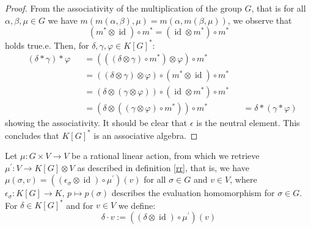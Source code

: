 \begin{proof}
  From the associativity of the multiplication of the group $G$, that is for all $\alpha,\beta,\mu \in G$ we have $m(m(\alpha,\beta),\mu) = m(\alpha,m(\beta,\mu))$, we observe that
  \begin{equation}
    \left(m^\ast \otimes \operatorname{id} \right) \circ m^\ast = \left( \operatorname{id} \otimes m^\ast \right) \circ m^\ast
  \end{equation}
  holds true.e.
  Then, for $\delta, \gamma, \varphi \in K \left\lbrack G \right\rbrack^\ast$:
  \begin{equation}
    \begin{aligned}
      &\left( \delta \ast \gamma \right) \ast \varphi
      &&= \left( \left( \left( \delta \otimes \gamma \right) \circ m^\ast \right) \otimes \varphi \right) \circ m^\ast \\
      &&&= \left( (\delta \otimes \gamma) \otimes \varphi \right) \circ \left( m^\ast \otimes \operatorname{id} \right) \circ m^\ast  \\
      &&&= \left( \delta \otimes (\gamma \otimes \varphi) \right) \circ \left( \operatorname{id} \otimes m^\ast \right) \circ m^\ast  \\
      &&&= \left( \delta \otimes \left( \left( \gamma \otimes \varphi \right) \circ m^\ast \right) \right) \circ m^\ast  
      &&= \delta \ast \left( \gamma \ast \varphi \right)
    \end{aligned}
  \end{equation}
  showing the associativity.
  It should be clear that $\epsilon$ is the neutral element.
  This concludes that $K \left\lbrack G \right\rbrack^\ast$ is an associative algebra.
\end{proof}

\begin{definition}\label{da}
  Let $\mu \colon G \times V \rightarrow V$ be a rational linear action, from which we retrieve \linebreak$\mu^\prime \colon V \rightarrow K[G]\otimes V$ as described in definition \ref{rr}, that is, we have $\mu(\sigma,v) = ((\epsilon_\sigma \otimes \operatorname{id})\circ\mu^\prime)(v)$ for all $\sigma \in G$ and $v \in V$, where $\epsilon_\sigma \colon K[G] \rightarrow K$, $p \mapsto p(\sigma)$ describes the evaluation homomorphism for $\sigma \in G$.
  For $\delta \in K[G]^\ast$ and for $v \in V$ we define:
  \begin{equation}
    \delta \cdot v := \left(\left( \delta \otimes \operatorname{id} \right) \circ \mu^\prime \right) \left(v\right)
  \end{equation}
\end{definition}

